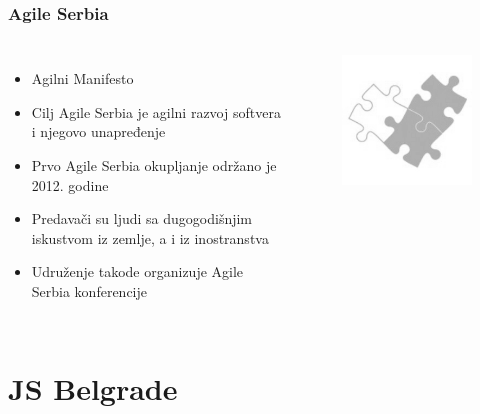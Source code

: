 \documentclass[hyperref={bookmarks=false},aspectratio=169]{beamer}
\begin{document}
\begin{frame}
\frametitle{Agile Serbia}

\begin{columns}[T]

\begin{itemize}
    \item Agilni Manifesto
    \item Cilj Agile Serbia je agilni razvoj softvera i njegovo unapređenje
    \item Prvo Agile Serbia okupljanje održano je 2012. godine
    \item Predavači su ljudi sa dugogodišnjim iskustvom iz zemlje, a i iz inostranstva
    \item Udruženje takode organizuje Agile Serbia konferencije 
\end{itemize}



\begin{figure}
    \raggedleft
    \includegraphics[scale=0.4]{./images/agile_srb.png}
\end{figure}

\end{columns}
\end{frame}

\section{JS Belgrade}
\end{document}
